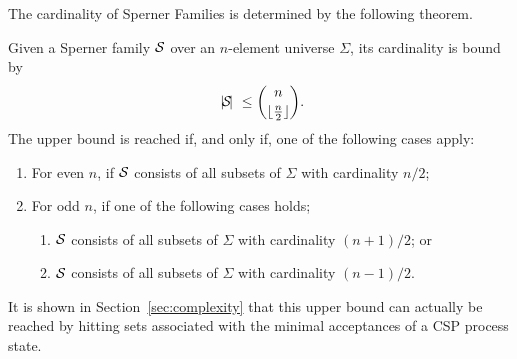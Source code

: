 The cardinality of Sperner Families is determined by the following theorem.
\begin{theorem}
\label{th:sperner}
Given a  Sperner family ${\cal S}$
over an $n$-element universe $\Sigma$, its cardinality is bound by
\[
{~|\! {\cal S}\!|~} \le \binom{n}{\lfloor\frac{n}{2}\rfloor}.
\]
The upper bound is reached if, and only if, one of the following cases apply:
\begin{enumerate}
\item For even $n$, if ${\cal S}$ consists of all subsets of $\Sigma$ with
    cardinality $n/2$;
\item For odd $n$, if one of the following cases holds;
\begin{enumerate}
\item ${\cal S}$ consists of all subsets of $\Sigma$ with cardinality $(n+1)/2$;
    or
\item ${\cal S}$ consists of all subsets of $\Sigma$ with cardinality $(n-1)/2$.
\end{enumerate}
\end{enumerate}
\xbox
\end{theorem}
It is shown in Section~\ref{sec:complexity} that this upper bound can
actually be reached by hitting sets associated with the minimal acceptances
of a CSP process state.
